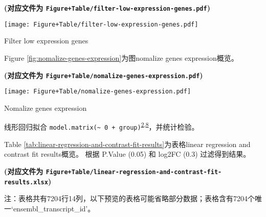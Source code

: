 \documentclass[
]{article}
\begin{document}
\textbf{(对应文件为 \texttt{Figure+Table/filter-low-expression-genes.pdf})}

\def\@captype{figure}
\begin{center}
\texttt{[image: Figure+Table/filter-low-expression-genes.pdf]}
\caption{Filter low expression genes}\label{fig:filter-low-expression-genes}
\end{center}

Figure \ref{fig:nomalize-genes-expression}为图nomalize genes expression概览。

\textbf{(对应文件为 \texttt{Figure+Table/nomalize-genes-expression.pdf})}

\def\@captype{figure}
\begin{center}
\texttt{[image: Figure+Table/nomalize-genes-expression.pdf]}
\caption{Nomalize genes expression}\label{fig:nomalize-genes-expression}
\end{center}

线形回归拟合 \texttt{model.matrix(\textasciitilde{}\ 0\ +\ group)}\textsuperscript{\protect\hyperlink{ref-LimmaPowersDiRitchi2015}{2},\protect\hyperlink{ref-AGuideToCreaLawC2020}{8}}，并统计检验。

Table \ref{tab:linear-regression-and-contrast-fit-results}为表格linear regression and contrast fit results概览。
根据 P.Value (0.05) 和 \textbar log2FC\textbar{} (0.3) 过滤得到结果。

\textbf{(对应文件为 \texttt{Figure+Table/linear-regression-and-contrast-fit-results.xlsx})}

\begin{center}\begin{tcolorbox}[colback=gray!10, colframe=gray!50, width=0.9\linewidth, arc=1mm, boxrule=0.5pt]注：表格共有7204行14列，以下预览的表格可能省略部分数据；表格含有7204个唯一`ensembl\_transcript\_id'。
\end{tcolorbox}
\end{center}
\end{document}
